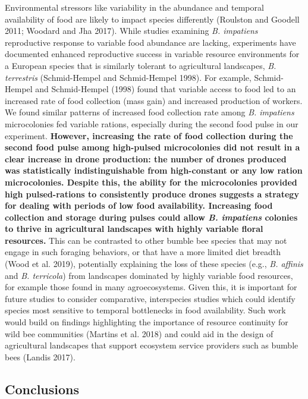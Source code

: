 \documentclass[11pt,]{article}
\begin{document}
Environmental stressors like variability in the abundance and temporal
availability of food are likely to impact species differently (Roulston
and Goodell 2011; Woodard and Jha 2017). While studies examining
\emph{B. impatiens} reproductive response to variable food abundance are
lacking, experiments have documented enhanced reproductive success in
variable resource environments for a European species that is similarly
tolerant to agricultural landscapes, \emph{B. terrestris} (Schmid-Hempel
and Schmid-Hempel 1998). For example, Schmid-Hempel and Schmid-Hempel
(1998) found that variable access to food led to an increased rate of
food collection (mass gain) and increased production of workers. We
found similar patterns of increased food collection rate among \emph{B.
impatiens} microcolonies fed variable rations, especially during the
second food pulse in our experiment. \textbf{However, increasing the
rate of food collection during the second food pulse among high-pulsed
microcolonies did not result in a clear increase in drone production:
the number of drones produced was statistically indistinguishable from
high-constant or any low ration microcolonies. Despite this, the ability
for the microcolonies provided high pulsed-rations to consistently
produce drones suggests a strategy for dealing with periods of low food
availability. Increasing food collection and storage during pulses could
allow \emph{B. impatiens} colonies to thrive in agricultural landscapes
with highly variable floral resources.} This can be contrasted to other
bumble bee species that may not engage in such foraging behaviors, or
that have a more limited diet breadth (Wood et al. 2019), potentially
explaining the loss of these species (e.g., \emph{B. affinis} and
\emph{B. terricola}) from landscapes dominated by highly variable food
resources, for example those found in many agroecosystems. Given this,
it is important for future studies to consider comparative, interspecies
studies which could identify species most sensitive to temporal
bottlenecks in food availability. Such work would build on findings
highlighting the importance of resource continuity for wild bee
communities (Martins et al. 2018) and could aid in the design of
agricultural landscapes that support ecosystem service providers such as
bumble bees (Landis 2017).

\hypertarget{conclusions}{%
\subsection{Conclusions}\label{conclusions}}
\end{document}
